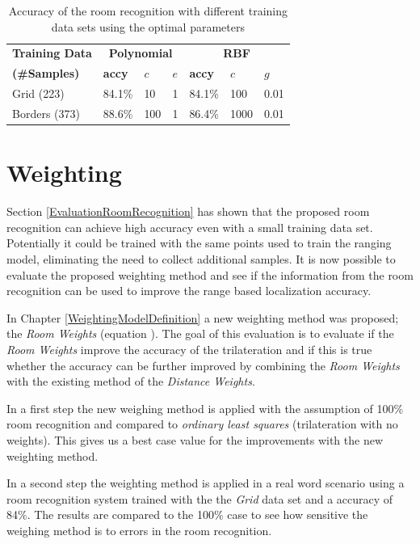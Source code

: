 \begin{table}
\centering
\begin{tabular}{l l l l l l l}
\toprule
\textbf{Training Data}&\multicolumn{3}{c}{\textbf{Polynomial}}&\multicolumn{3}{c}{\textbf{RBF}}\\
\textbf{(\#Samples)}&\textbf{accy}&$c$&$e$&\textbf{accy}&$c$&$g$\\
\midrule
Grid (223)&84.1\%&10&1&84.1\%&100&0.01\\
Borders (373)&88.6\%&100&1&86.4\%&1000&0.01\\
\bottomrule
\end{tabular}
\caption[Room Recognition - optimized parameters]{Accuracy of the room recognition with different training data sets using the optimal parameters}
\label{tab:SVMconfigurationPoly}
\end{table}

\newpage

\section{Weighting}
\label{EvaluationWeighting}

Section \ref{EvaluationRoomRecognition} has shown that the proposed room recognition can achieve high accuracy even with a small training data set. Potentially it could be trained with the same points used to train the ranging model, eliminating the need to collect additional samples. It is now possible to evaluate the proposed weighting method and see if the information from the room recognition can be used to improve the range based localization accuracy.

In Chapter \ref{WeightingModelDefinition} a new weighting method was proposed; the \emph{Room Weights} (equation ). The goal of this evaluation is to evaluate if the \emph{Room Weights} improve the accuracy of the trilateration and if this is true whether the accuracy can be further improved by combining the \emph{Room Weights} with the existing method of the \emph{Distance Weights}.

In a first step the new weighing method is applied with the assumption of 100\% room recognition and compared to \emph{ordinary least squares} (trilateration with no weights). This gives us a best case value for the improvements with the new weighting method.

In a second step the weighting method is applied in a real word scenario using a room recognition system trained with the the \emph{Grid} data set and a accuracy of 84\%. The results are compared to the 100\% case to see how sensitive the weighing method is to errors in the room recognition.

